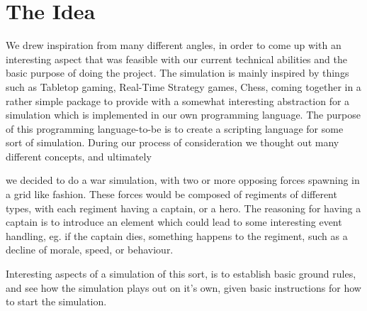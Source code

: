 \section{The Idea}
	We drew inspiration from many different angles, in order to come up with an interesting aspect that was feasible with our current technical abilities and the basic purpose of doing the project.
	The simulation is mainly inspired by things such as Tabletop gaming, Real-Time Strategy games, Chess, coming together in a rather simple package to provide with a somewhat interesting abstraction for a simulation which is implemented in our own programming language.
	The purpose of this programming language-to-be 
	is to create a scripting language for some sort of simulation. 
	During our process of consideration we thought out many different concepts, 
	and ultimately 
	\begin{comment}we came to a decision that it would be more interesting to 
	have a controlled environment with a lot of units participating. Reasons for 
	this is that the simulation would not be very interesting to perform when dealing with minor numbers, 
	the reasoning behind this is that we do not expect to make a very complicated simulation, therefore dealing in larger numbers proved 
	more interesting to us. \newline
	
	Ultimately\end{comment}
	we decided to do a war simulation, with two or more opposing forces 
	spawning in a grid like fashion. These forces would be composed of regiments of 
	different types, with each regiment having a captain, or a hero. The reasoning for having a 
	captain is to introduce an element which could lead to some interesting event handling, 
	eg. if the captain dies, something happens to the regiment, such as a decline of morale, speed, or behaviour. \newline
	
	Interesting aspects of a simulation of this sort, is to establish basic ground rules, 
	and see how the simulation plays out on it's own, given basic instructions for how to start the simulation.